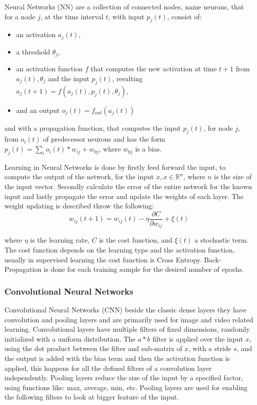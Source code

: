 \documentclass[12pt]{article}
\theoremstyle{definition}
\begin{document}
	Neural Networks (NN) are a collection of connected nodes, name neurons, that for a node $j$, at the time interval $t$, with input  $p_j(t)$, consist of:
	\begin{itemize}
		\item an activation $a_j(t)$,
		\item a threshold $\theta_j$,
		\item an activation function $f$ that computes the new activation at time $t+1$ from $a_j(t), \theta_j$ and the input $p_j(t)$, resulting $a_j(t+1)=f(a_j(t), p_j(t), \theta_j)$,
		\item and an output $o_j(t)=f_{out}(a_j(t))$
	\end{itemize}
	and with a propagation function, that computes the input $p_j(t)$, for node $j$, from $o_i(t)$ of predecessor neurons and has the form $p_j(t)=\sum_io_i(t)*w_{ij} + w_{0j}$, where $w_{0j}$ is a bias.

	Learning in Neural Networks is done by firstly feed forward the input, to compute the output of the network, for the input $x, x \in \mathbb{R}^n$, where $n$ is the size of the input vector. Secondly calculate the error of the entire network for the known input and lastly propagate the error and update the weights of each layer. The weight updating is described throw the following:
	\begin{equation*}
		w_{ij}(t+1)=w_{ij}(t)-\eta\frac{\partial C}{\partial w_{ij}}+ \xi(t)
	\end{equation*}

	where $\eta$ is the learning rate, $C$ is the cost function, and $\xi(t)$ a stochastic term. The cost function depends on the learning type and the activation function, usually in supervised learning the cost function is Cross Entropy. Back-Propagation is done for each training sample for the desired number of epochs.


	\subsubsection{Convolutional Neural Networks}

	Convolutional Neural Networks (CNN) beside the classic dense layers they have convolution and pooling layers and are primarily used for image and video related learning.
	Convolutional layers have multiple filters of fixed dimensions, randomly initialized with a uniform distribution. The $a*b$ filter is applied over the input $x$, using the dot product between the filter and sub-matrix of $x$,  with a stride $s$, and the output is added with the bias term and then the activation function is applied, this happens for all the defined filters of a convolution layer independently. Pooling layers reduce the size of the input by a specified factor, using functions like: max, average, min, etc. Pooling layers are used for enabling the following filters to look at bigger feature of the input.
\end{document}
